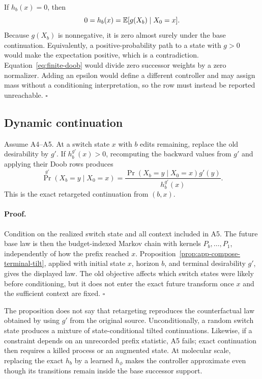 If $h_b(x)=0$, then
\[
  0=h_b(x)=\mathbb{E}[g(X_b)\mid X_0=x].
\]
Because $g(X_b)$ is nonnegative, it is zero almost surely under the base
continuation.  Equivalently, a positive-probability path to a state with
$g>0$ would make the expectation positive, which is a contradiction.
Equation~\eqref{eq:finite-doob} would divide zero successor weights by a zero
normalizer.  Adding an epsilon would define a different controller and may
assign mass without a conditioning interpretation, so the row must instead
be reported unreachable.
\hfill$\square$

\subsection{Dynamic continuation}
\label{sec:app-compose-dynamic-proof}

\begin{composeappendixproposition}
\label{prop:app-compose-dynamic}
Assume A4--A5.  At a switch state $x$ with $b$ edits remaining, replace the
old desirability by $g'$.  If $h_b^{g'}(x)>0$, recomputing the backward values
from $g'$ and applying their Doob rows produces
\[
  \Pr^{g'}(X_b=y\mid X_0=x)
  =
  \frac{\Pr(X_b=y\mid X_0=x)g'(y)}
       {h_b^{g'}(x)}.
\]
This is the exact retargeted continuation from $(b,x)$.
\end{composeappendixproposition}

\paragraph{Proof.}
Condition on the realized switch state and all context included in A5.  The
future base law is then the budget-indexed Markov chain with kernels
$P_b,\ldots,P_1$, independently of how the prefix reached $x$.
Proposition~\ref{prop:app-compose-terminal-tilt}, applied with initial state
$x$, horizon $b$, and terminal desirability $g'$, gives the displayed law.
The old objective affects which switch states were likely before
conditioning, but it does not enter the exact future transform once $x$ and
the sufficient context are fixed.
\hfill$\square$

The proposition does not say that retargeting reproduces the counterfactual
law obtained by using $g'$ from the original source.  Unconditionally, a
random switch state produces a mixture of state-conditional tilted
continuations.  Likewise, if a constraint depends on an unrecorded prefix
statistic, A5 fails; exact continuation then requires a killed process or an
augmented state.  At molecular scale, replacing the exact $h_b$ by a learned
$h_\phi$ makes the controller approximate even though its transitions remain
inside the base successor support.

